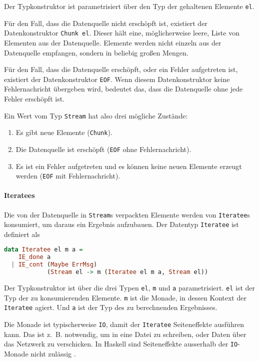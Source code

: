 \documentclass[draft=false
              ,paper=a4
              ,twoside=false
              ,fontsize=11pt
              ,headsepline
              ,BCOR10mm
              ,DIV11
              ]{scrbook}
\begin{document}
Der Typkonstruktor ist parametrisiert über den Typ der gehaltenen Elemente \lstinline|el|.

Für den Fall, dass die Datenquelle nicht erschöpft ist, existiert der Datenkonstruktor \lstinline|Chunk el|.
Dieser hält eine, möglicherweise leere, Liste von Elementen aus der Datenquelle.
Elemente werden nicht einzeln aus der Datenquelle empfangen, sondern in beliebig großen Mengen.

Für den Fall, dass die Datenquelle erschöpft, oder ein Fehler aufgetreten ist, existiert der Datenkonstruktor \lstinline|EOF|.
Wenn diesem Datenkonstruktor keine Fehlernachricht übergeben wird, bedeutet das, dass die Datenquelle ohne jede Fehler erschöpft ist.

Ein Wert vom Typ \lstinline|Stream| hat also drei mögliche Zustände:
\begin{enumerate}
  \item Es gibt neue Elemente (\lstinline|Chunk|).
  \item Die Datenquelle ist erschöpft (\lstinline|EOF| ohne Fehlernachricht).
  \item Es ist ein Fehler aufgetreten und es können keine neuen Elemente erzeugt werden (\lstinline|EOF| mit Fehlernachricht).
\end{enumerate}



\paragraph{Iteratees} %
\label{par:iteratees}\mbox{} %

Die von der Datenquelle in \lstinline|Stream|s verpackten Elemente werden von \lstinline|Iteratee|s konsumiert, um daraus ein Ergebnis aufzubauen.
Der Datentyp \lstinline|Iteratee| ist definiert als
\begin{lstlisting}[language=Haskell]
data Iteratee el m a =
    IE_done a
  | IE_cont (Maybe ErrMsg)
            (Stream el -> m (Iteratee el m a, Stream el))
\end{lstlisting}

Der Typkonstruktor ist über die drei Typen \lstinline|el|, \lstinline|m| und \lstinline|a| parametrisiert.
\lstinline|el| ist der Typ der zu konsumierenden Elemente.
\lstinline|m| ist die Monade, in dessen Kontext der \lstinline|Iteratee| agiert.
Und \lstinline|a| ist der Typ des zu berechnenden Ergebnisses.

Die Monade ist typischerweise \lstinline|IO|, damit der \lstinline|Iteratee| Seiteneffekte ausführen kann.
Das ist z.~B. notwendig, um in eine Datei zu schreiben, oder Daten über das Netzwerk zu verschicken.
In Haskell sind Seiteneffekte ausserhalb der \lstinline|IO|-Monade nicht zulässig \cite[vgl.][]{haskell_io}.
\end{document}
